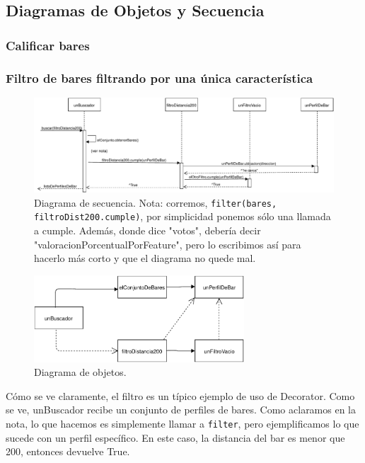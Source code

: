 \subsection{Diagramas de Objetos y Secuencia}

\subsubsection{Calificar bares}

\subsubsection{Filtro de bares filtrando por una única característica}


\begin{figure}[H]
  \centering
  \includegraphics[width=\textwidth]{diagramas/secuencia_2.pdf}
  \caption{\normalfont Diagrama de secuencia. Nota: corremos, \texttt{filter(bares, filtroDist200.cumple)}, por simplicidad ponemos sólo una llamada a cumple.
Además, donde dice "votos", debería decir "valoracionPorcentualPorFeature", pero lo escribimos así para hacerlo más corto y que el diagrama no quede mal.
	}
\end{figure}

\begin{figure}[H]
  \centering
  \includegraphics[width=0.7\textwidth]{diagramas/objetos_2.pdf}
  \caption{\normalfont Diagrama de objetos.}
\end{figure}

Cómo se ve claramente, el filtro es un típico ejemplo de uso de Decorator. Como se ve, unBuscador recibe un conjunto de perfiles de bares. Como aclaramos en la nota, lo que hacemos es simplemente llamar a \texttt{filter}, pero ejemplificamos lo que sucede con un perfil específico. En este caso, la distancia del bar es menor que 200, entonces devuelve True.


